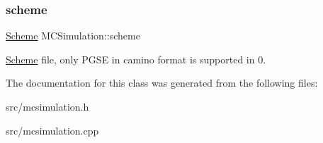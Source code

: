 \subsubsection{\texorpdfstring{scheme}{scheme}}
{\footnotesize\ttfamily \hyperlink{class_scheme}{Scheme} M\+C\+Simulation\+::scheme}

\hyperlink{class_scheme}{Scheme} file, only P\+G\+SE in camino format is supported in 0. 

The documentation for this class was generated from the following files\+:\begin{DoxyCompactItemize}
\item 
src/mcsimulation.\+h\item 
src/mcsimulation.\+cpp\end{DoxyCompactItemize}
